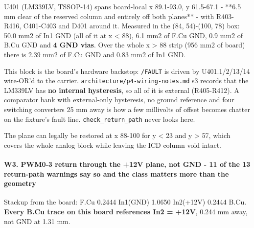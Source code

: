 \documentclass[11pt,a4paper]{article}
\begin{document}
U401 (LM339LV, TSSOP-14) spans board-local x 89.1-93.0, y 61.5-67.1 - {*}{*}6.5 mm clear of the reserved column and entirely off both planes{*}{*} - with R403-R416, C401-C403 and D401 around it. Measured in the (84, 54)-(100, 78) box: 50.0 mm2 of In1 GND (all of it at x \textless{} 88), 6.1 mm2 of F.Cu GND, 0.9 mm2 of B.Cu GND and \textbf{4 GND vias}. Over the whole x \textgreater{} 88 strip (956 mm2 of board) there is 2.39 mm2 of F.Cu GND and 0.83 mm2 of In1 GND.

This block is the board's hardware backstop: \texttt{/FAULT} is driven by U401.1/2/13/14 wire-OR'd to the carrier. \texttt{architecture/p4-wiring-notes.md} s3 records that the LM339LV has \textbf{no internal hysteresis}, so all of it is external (R405-R412). A comparator bank with external-only hysteresis, no ground reference and four switching converters 25 mm away is how a few millivolts of offset becomes chatter on the fixture's fault line. \texttt{check\_return\_path} never looks here.

The plane can legally be restored at x 88-100 for y \textless{} 23 and y \textgreater{} 57, which covers the whole analog block while leaving the ICD column void intact.

\paragraph*{W3. PWM0-3 return through the +12V plane, not GND - 11 of the 13 return-path warnings say so and the class matters more than the geometry}
Stackup from the board: F.Cu \textbar{} 0.2444 \textbar{} In1(GND) \textbar{} 1.0650 \textbar{} In2(+12V) \textbar{} 0.2444 \textbar{} B.Cu. \textbf{Every B.Cu trace on this board references In2 = +12V}, 0.244 mm away, not GND at 1.31 mm.
\end{document}
